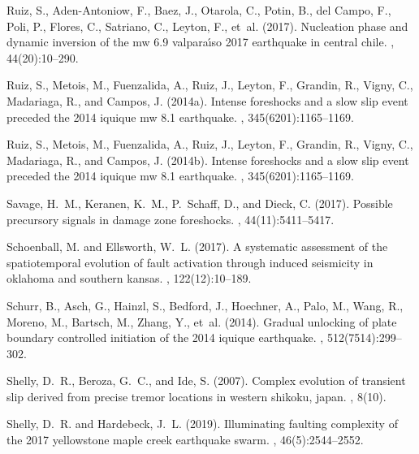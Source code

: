 \documentclass[a4paper,12pt,twoside]{article}
\begin{document}
\begin{thebibliography}{}
Ruiz, S., Aden-Antoniow, F., Baez, J., Otarola, C., Potin, B., del Campo, F.,
  Poli, P., Flores, C., Satriano, C., Leyton, F., et~al. (2017).
\newblock Nucleation phase and dynamic inversion of the mw 6.9 valpara{\'\i}so
  2017 earthquake in central chile.
, 44(20):10--290.

Ruiz, S., Metois, M., Fuenzalida, A., Ruiz, J., Leyton, F., Grandin, R., Vigny,
  C., Madariaga, R., and Campos, J. (2014a).
\newblock Intense foreshocks and a slow slip event preceded the 2014 iquique mw
  8.1 earthquake.
, 345(6201):1165--1169.

Ruiz, S., Metois, M., Fuenzalida, A., Ruiz, J., Leyton, F., Grandin, R., Vigny,
  C., Madariaga, R., and Campos, J. (2014b).
\newblock Intense foreshocks and a slow slip event preceded the 2014 iquique mw
  8.1 earthquake.
, 345(6201):1165--1169.

Savage, H.~M., Keranen, K.~M., P.~Schaff, D., and Dieck, C. (2017).
\newblock Possible precursory signals in damage zone foreshocks.
, 44(11):5411--5417.

Schoenball, M. and Ellsworth, W.~L. (2017).
\newblock A systematic assessment of the spatiotemporal evolution of fault
  activation through induced seismicity in oklahoma and southern kansas.
, 122(12):10--189.

Schurr, B., Asch, G., Hainzl, S., Bedford, J., Hoechner, A., Palo, M., Wang,
  R., Moreno, M., Bartsch, M., Zhang, Y., et~al. (2014).
\newblock Gradual unlocking of plate boundary controlled initiation of the 2014
  iquique earthquake.
, 512(7514):299--302.

Shelly, D.~R., Beroza, G.~C., and Ide, S. (2007).
\newblock Complex evolution of transient slip derived from precise tremor
  locations in western shikoku, japan.
, 8(10).

Shelly, D.~R. and Hardebeck, J.~L. (2019).
\newblock Illuminating faulting complexity of the 2017 yellowstone maple creek
  earthquake swarm.
, 46(5):2544--2552.


\end{thebibliography}
\end{document}
